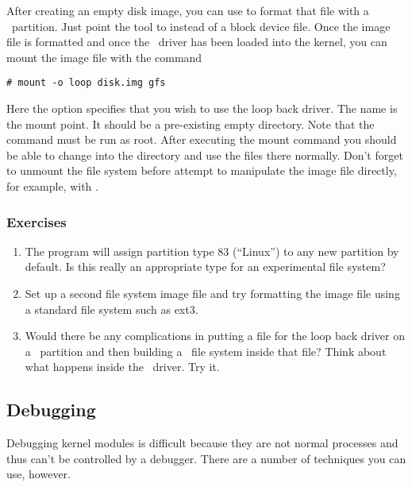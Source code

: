 After creating an empty disk image, you can use  to format that file with a
\GenericFS\ partition. Just point the tool to  instead of a block device
file. Once the image file is formatted and once the \GenericFS\ driver has been loaded into the
kernel, you can mount the image file with the command
\begin{verbatim}
# mount -o loop disk.img gfs
\end{verbatim}

Here the  option specifies that you wish to use the loop back driver. The name
 is the mount point. It should be a pre-existing empty directory. Note that the
 command must be run as root. After executing the mount command you should be
able to change into the  directory and use the files there normally. Don't forget
to unmount the file system before attempt to manipulate the image file directly, for example,
with .

\subsubsection*{Exercises}

\begin{enumerate}

\item The  program will assign partition type 83 (``Linux'') to any new partition
  by default. Is this really an appropriate type for an experimental file system?

\item Set up a second file system image file and try formatting the image file using a standard
  file system such as ext3.

\item Would there be any complications in putting a file for the loop back driver on a
  \GenericFS\ partition and then building a \GenericFS\ file system inside that file? Think
  about what happens inside the \GenericFS\ driver. Try it.

\end{enumerate}

\subsection{Debugging \GenericFS}
\label{sec:debugging}

Debugging kernel modules is difficult because they are not normal processes and thus can't be
controlled by a debugger. There are a number of techniques you can use, however.

